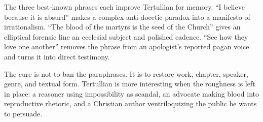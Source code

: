 The three best-known phrases each improve Tertullian for memory. ``I believe
because it is absurd'' makes a complex anti-docetic paradox into a manifesto of
irrationalism. ``The blood of the martyrs is the seed of the Church'' gives an
elliptical forensic line an ecclesial subject and polished cadence. ``See how
they love one another'' removes the phrase from an apologist's reported pagan
voice and turns it into direct testimony.

The cure is not to ban the paraphrases. It is to restore work, chapter, speaker,
genre, and textual form. Tertullian is more interesting when the roughness is
left in place: a reasoner using impossibility as scandal, an advocate making
blood into reproductive rhetoric, and a Christian author ventriloquizing the
public he wants to persuade.
